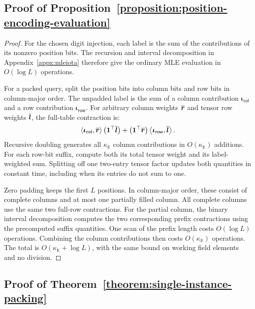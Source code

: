 \subsection{Proof of Proposition~\ref{proposition:position-encoding-evaluation}}
\label{appx:proof-position-encoding}

\begin{proof}
For the chosen digit injection, each label is the sum of the
contributions of its nonzero position bits.
The recursion and interval decomposition in
Appendix~\ref{appx:mleiota} therefore give the ordinary MLE
evaluation in \(O(\log L)\) operations.

For a packed query, split the position bits into column bits
and row bits in column-major order.
The unpadded label is the sum of a column contribution
\(\bm\iota_{\mathsf{col}}\) and a row contribution
\(\bm\iota_{\mathsf{row}}\).
For arbitrary column weights \(\overline{\bm r}\) and tensor row
weights \(\overline{\bm l}\), the full-table contraction is:
\[
    \left\langle\bm\iota_{\mathsf{col}},\overline{\bm r}\right\rangle
       \left(\bm1^\top\overline{\bm l}\right)
    +
    \left(\bm1^\top\overline{\bm r}\right)
       \left\langle\bm\iota_{\mathsf{row}},\overline{\bm l}\right\rangle.
\]
Recursive doubling generates all \(\kappa_{\mathbb K}\)
column contributions in \(O(\kappa_{\mathbb K})\) additions.
For each row-bit suffix, compute both its total tensor weight
and its label-weighted sum.
Splitting off one two-entry tensor factor updates both
quantities in constant time, including when its entries do
not sum to one.

Zero padding keeps the first \(L\) positions.
In column-major order, these consist of complete columns
and at most one partially filled column.
All complete columns use the same two full-row contractions.
For the partial column, the binary interval decomposition
computes the two corresponding prefix contractions using the
precomputed suffix quantities.
One scan of the prefix length costs \(O(\log L)\) operations.
Combining the column contributions then costs
\(O(\kappa_{\mathbb K})\) operations.
The total is \(O(\kappa_{\mathbb K}+\log L)\), with the same
bound on working field elements and no division.
\end{proof}

\subsection{Proof of Theorem~\ref{theorem:single-instance-packing}}
\label{appx:proof-single-instance}


